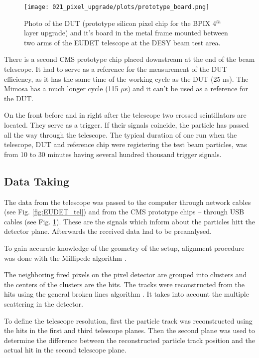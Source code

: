 \begin{figure}[t]
 \centering
 \texttt{[image: 021\_pixel\_upgrade/plots/prototype\_board.png]}
 \caption{Photo of the DUT (prototype silicon pixel chip for the BPIX 4$^{th}$ layer upgrade) and it's board in the metal frame
 mounted between two arms of the EUDET telescope at the DESY beam test area.}
 \label{fig:prototype_board}
\end{figure}

There is a second CMS prototype chip placed downstream at the end of the beam telescope. It had to serve as a reference for the
measurement of the DUT efficiency, as it has the same time of the working cycle as the DUT (25 ns). The Mimosa has a much longer
cycle (115 $\mu$s) and it can't be used as a reference for the DUT.

On the front before and in right after the telescope two crossed scintillators are located. They serve as a trigger. 
If their signals coincide, the particle has passed all the way through the telescope.
The typical duration of one run when the telescope, DUT and reference chip were registering the test beam particles, was from 10
to 30 minutes having several hundred thousand trigger signals.

\subsection{Data Taking}

The data from the telescope was passed to the computer through network cables (see Fig. \ref{fig:EUDET_tel}) and from
the CMS prototype chips -- through USB cables (see Fig. \ref{fig:prototype_board}). These are the signals which inform
about the particles hitt the detector plane.  Afterwards the received data had to be preanalysed. 

To gain accurate knowledge of the geometry of the setup, alignment procedure was done with the Millipede algorithm 
\cite{1748-0221-3-09-P09002}.

The neighboring fired pixels on the pixel detector are grouped into clusters and the centers of the clusters are the hits.
The tracks were reconstructed from the hits using the general broken lines algorithm \cite{Blobel:2006yi}. It takes into
account the multiple scattering in the detector. 

To define the telescope resolution, first the particle track was reconstructed using the hits in the first and third telescope planes.
Then the second plane was used to determine the difference between the reconstructed particle track position and the actual hit in the 
second telescope plane.

